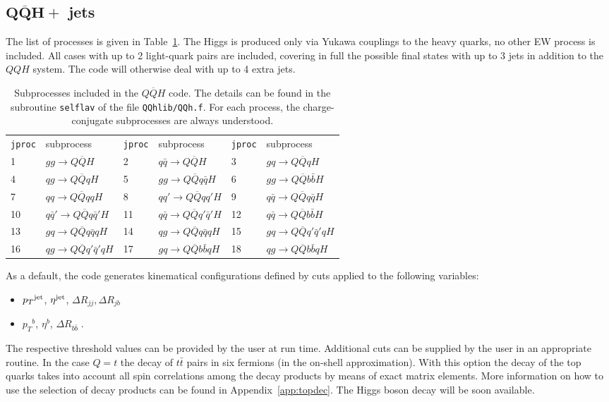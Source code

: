 \documentclass[paper]{JHEP3}
\newcommand{\ccaption}[2]{
    \begin{center}
    \parbox{0.85\textwidth}{
      \caption[#1]{\small{{#2}}}
      }
    \end{center}
    }
\def    \qbar   {\bar{q}}
\def    \bbar   {\bar{b}}
\def    \Qbar   {\overline{Q}}
\def    \pt             {\mbox{$p_T$}}
\begin{document}
\subsection{$\mathbf{Q \Qbar H +}$ jets}
\label{sec:QQH}
The list of processes is given in 
Table~\ref{tab:QQH}. The Higgs is produced only via Yukawa couplings
to the heavy quarks, no other EW process is included.
All cases with up to 2 light-quark pairs are
included, covering in full the possible final states with up to 3
jets in addition to the $QQH$ system. The code will otherwise deal
with up to 4 extra jets.
\begin{table}
\begin{center}
\begin{tabular}{ll|ll|ll}
{\tt jproc} & subprocess & {\tt jproc} & subprocess & {\tt jproc} & 
subprocess \\  
1  &  $g g \to  Q\Qbar H$   &
2 &  $q \qbar \to Q\Qbar H$ &
3 &  $g q \to Q\Qbar q H$ \\
4 &  $q g \to Q\Qbar q H$ &
5 &  $g g \to Q\Qbar q \qbar H$ &
6 &  $g g \to Q\Qbar b \bbar H$ \\
7 &  $q q \to Q\Qbar q q H$ &
8 &  $q q' \to Q\Qbar q q' H$ &
9 &  $q \qbar \to Q\Qbar q \qbar H$ \\
10 &  $q \qbar' \to Q\Qbar q \qbar' H$ &
11 &  $q \qbar \to Q\Qbar q' \qbar' H$ &
12 &  $q \qbar \to Q\Qbar b \bbar H$ \\
13 &  $g q \to Q\Qbar q \qbar q H$ &
14 &  $q g \to Q\Qbar q \qbar q H$ &
15 &  $g q \to Q\Qbar q' \qbar' q H$  \\
16 &  $q g \to Q\Qbar q' \qbar' q H$ &
17 &  $g q \to Q\Qbar b \bbar q H$ &
18 &  $q g \to Q\Qbar b \bbar q H$  \\
\end{tabular}
\ccaption{}{\label{tab:QQH} Subprocesses included in the $Q\Qbar H$ code. 
  The details can be found in the subroutine {\tt selflav} of
  the file {\tt QQhlib/QQh.f}. For each process, the charge-conjugate
  subprocesses are always understood.}
\end{center}
\end{table}

As a default, the code generates kinematical configurations defined by
cuts applied to the following variables:
\begin{itemize}
\item $\pt^{\rm jet}$, $\eta^{\rm jet}$, $\Delta R_{jj}, \Delta R_{jb}$
\item $\pt^{ b}$, $\eta^{ b}$, $\Delta R_{b\bar{b}} \; .$
\end{itemize}
The respective threshold values can be provided by the user at run
time. Additional cuts can be supplied by the user in an appropriate
routine. In the case $Q=t$ the decay of $t \bar t$ pairs in six fermions 
(in the on-shell approximation). 
With this option the decay of the top quarks takes into account 
all spin correlations among the decay products by means of exact 
matrix elements. More information on how to use 
the selection of decay products can 
be found in Appendix~\ref{app:topdec}. The Higgs boson decay will be soon available.
\end{document}
